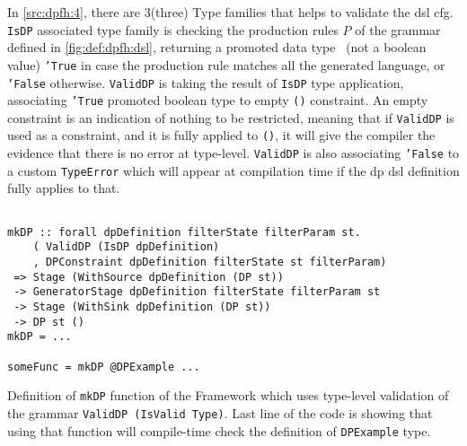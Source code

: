 In \autoref{src:dpfh:4}, there are 3(three) Type families that helps to validate the \acrshort{dsl} \acrshort{cfg}. 
\texttt{IsDP} associated type family is checking the production rules $P$ of the grammar defined in \autoref{fig:def:dpfh:dsl}, returning a promoted data type~\cite{promoted-types} (not a boolean value) \texttt{'True} in case
the production rule matches all the generated language, or \texttt{'False} otherwise. 
\texttt{ValidDP} is taking the result of \texttt{IsDP} type application, associating \texttt{'True} promoted boolean type to empty \texttt{()} constraint. An empty constraint is an 
indication of nothing to be restricted, meaning that if \texttt{ValidDP} is used as a constraint, and it is fully applied to \texttt{()}, it will give the compiler the evidence that there is no error at type-level.
\texttt{ValidDP} is also associating \texttt{'False} to a custom \texttt{TypeError} which will appear at compilation time if the \acrshort{dp} \acrshort{dsl} definition fully applies to that.

\begin{listing}[H]
  \begin{verbatim}

mkDP :: forall dpDefinition filterState filterParam st.
    ( ValidDP (IsDP dpDefinition)
    , DPConstraint dpDefinition filterState st filterParam)
 => Stage (WithSource dpDefinition (DP st)) 
 -> GeneratorStage dpDefinition filterState filterParam st  
 -> Stage (WithSink dpDefinition (DP st))  
 -> DP st ()
mkDP = ...

someFunc = mkDP @DPExample ...

  \end{verbatim}
  \caption[{[\texttt{Stage.hs}] Using validation of \acrshort{dp} encoded in $G_{dsl}$}]{Definition of \texttt{mkDP} function of the Framework which uses type-level validation of the grammar \texttt{ValidDP (IsValid Type)}. Last line of the code is showing that using that function will compile-time check the definition of \texttt{DPExample} type.}
  \label{src:dpfh:5}
\end{listing}

